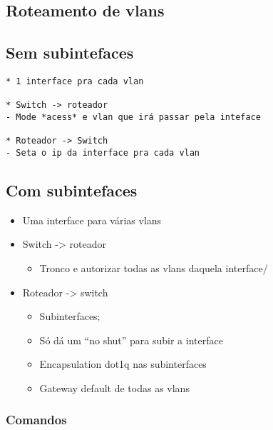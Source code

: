 \documentclass[]{article}
\providecommand{\tightlist}{%
  \setlength{\itemsep}{0pt}\setlength{\parskip}{0pt}}
\begin{document}
\hypertarget{roteamento-de-vlans}{%
\subsection{Roteamento de vlans}\label{roteamento-de-vlans}}

\hypertarget{sem-subintefaces}{%
\subsection{Sem subintefaces}\label{sem-subintefaces}}

\begin{verbatim}
* 1 interface pra cada vlan

* Switch -> roteador
- Mode *acess* e vlan que irá passar pela inteface 

* Roteador -> Switch
- Seta o ip da interface pra cada vlan
\end{verbatim}

\hypertarget{com-subintefaces}{%
\subsection{Com subintefaces}\label{com-subintefaces}}

\begin{itemize}
\item
  Uma interface para várias vlans
\item
  Switch -\textgreater{} roteador

  \begin{itemize}
  \tightlist
  \item
    Tronco e autorizar todas as vlans daquela interface/
  \end{itemize}
\item
  Roteador -\textgreater{} switch

  \begin{itemize}
  \item
    Subinterfaces;
  \item
    Só dá um ``no shut'' para subir a interface
  \item
    Encapsulation dot1q nas subinterfaces
  \item
    Gateway default de todas as vlans
  \end{itemize}
\end{itemize}

\hypertarget{comandos-1}{%
\subsubsection{Comandos}\label{comandos-1}}
\end{document}
